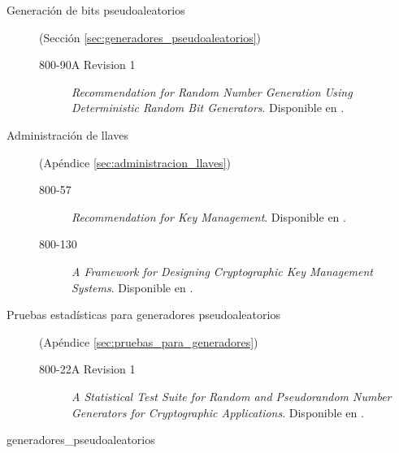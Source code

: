 \begin{description}


  \item[Generación de bits pseudoaleatorios] (Sección
    \ref{sec:generadores_pseudoaleatorios})
    \begin{description}
      \item[800-90A Revision 1] \textit{Recommendation for Random Number
        Generation Using Deterministic Random Bit Generators}. Disponible en
        \cite{nist_aleatorios}.
    \end{description}

  \item[Administración de llaves] (Apéndice \ref{sec:administracion_llaves})
    \begin{description}
      \item[800-57] \textit{Recommendation for Key Management}. Disponible en
        \cite{nist_llaves}.
      \item[800-130] \textit{A Framework for Designing Cryptographic Key
        Management Systems}. Disponible en \cite{nist_disenio_llaves}.
    \end{description}

  \item[Pruebas estadísticas para generadores pseudoaleatorios] (Apéndice
    \ref{sec:pruebas_para_generadores})
    \begin{description}
      \item[800-22A Revision 1] \textit{A Statistical Test Suite for Random and
        Pseudorandom Number Generators for Cryptographic Applications}.
        Disponible en \cite{nist_pruebas}.
    \end{description}
\end{description}



{generadores_pseudoaleatorios}
